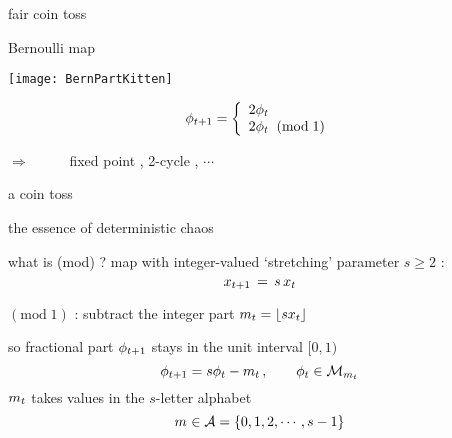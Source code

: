 \begin{frame}{fair coin toss} %
\renewcommand{\ssp}{\ensuremath{\phi}}             %
    \begin{block}{{Bernoulli}  map} %
\begin{center}
            \begin{minipage}[c]{0.36\textwidth}\begin{center}
\texttt{[image: BernPartKitten]}
            \end{center}\end{minipage}
            \hspace{2ex}
            \begin{minipage}[c]{0.46\textwidth}\begin{center}
\[
\ssp_{\zeit+1} =
\left\{ \begin{array}{l} %
        2 \ssp_{\zeit}
                             \\%
        2 \ssp_{\zeit} \;\; (\mbox{mod}\;1)
         \end{array}\right.
\]
            \end{center}\end{minipage}
\end{center}

\hfill $\Rightarrow$~~~~~
fixed point , 2-cycle , $\cdots$
    \end{block}

\bigskip

a 
{coin toss}

\hfill the essence of {\color{blue}deterministic chaos}
\end{frame} %

\begin{frame}{what is ({mod}) ?}
\renewcommand{\ssp}{\ensuremath{x}}             %
map with integer-valued {\color{blue}`stretching' parameter $s\geq2$} :
\[
\ssp_{\zeit+1} \,=\, {s}\,\ssp_{\zeit}
\] %

$(\mbox{mod}\;1)$ :
subtract the integer part
\(
\Ssym{\zeit}=\left\lfloor{s}\ssp_{\zeit}\right\rfloor
\)

\renewcommand{\ssp}{\ensuremath{\phi}}             %
so fractional part
$\ssp_{\zeit+1}$ stays in the unit interval $[0,1)$
\[
\ssp_{\zeit+1} = {s} \ssp_{\zeit} - \Ssym{\zeit}
\,,\qquad  \ssp_{\zeit}\in\pS_{\Ssym{\zeit}}
\] %
${m_{t}}$ takes values in the ${s}$-letter alphabet
\[
{m_{}} \in \mathcal{A}=\{0,1,2,\cdots,s-1\}
\] %
\end{frame} %

